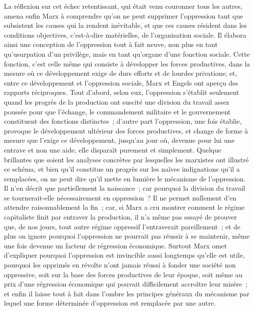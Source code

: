 \documentclass[french,twoside]{book} %
\begin{document}
La réflexion sur cet échec retentissant, qui était venu couronner tous les autres, amena enfin Marx à comprendre qu'on ne peut supprimer l'oppression tant que subsistent les causes qui la rendent inévitable, et que ces causes résident dans les conditions objectives, c'est-à-dire matérielles, de l'organisation sociale. Il élabora ainsi une conception de l'oppression tout à fait neuve, non plus en tant qu'usurpation d'un privilège, mais en tant qu'organe d'une fonction sociale. Cette fonction, c'est celle même qui consiste à développer les forces productives, dans la mesure où ce développement exige de durs efforts et de lourdes privations; et, entre ce développement et l'oppression sociale, Marx et Engels ont aperçu des rapports réciproques. Tout d'abord, selon eux, l'oppression s'établit seulement quand les progrès de la production ont suscité une division du travail assez poussée pour que l'échange, le commandement militaire et le gouvernement constituent des fonctions distinctes ; d'autre part l'oppression, une fois établie, provoque le développement ultérieur des forces productives, et change de forme à mesure que l'exige ce développement, jusqu'au jour où, devenue pour lui une entrave et non une aide, elle disparaît purement et simplement. Quelque brillantes que soient les analyses concrètes par lesquelles les marxistes ont illustré ce schéma, et bien qu'il constitue un progrès sur les naïves indignations qu'il a remplacées, on ne peut dire qu'il mette en lumière le mécanisme de l'oppression. Il n'en décrit que partiellement la naissance ; car pourquoi la division du travail se tournerait-elle nécessairement en oppression ? Il ne permet nullement d'en attendre raisonnablement la fin ; car, si Marx a cru montrer comment le régime capitaliste finit par entraver la production, il n'a même pas essayé de prouver que, de nos jours, tout autre régime oppressif l'entraverait pareillement ; et de plus on ignore pourquoi l'oppression ne pourrait pas réussir à se maintenir, même une fois devenue un facteur de régression économique. Surtout Marx omet d'expliquer pourquoi l'oppression est invincible aussi longtemps qu'elle est utile, pourquoi les opprimés en révolte n'ont jamais réussi à fonder une société non oppressive, soit sur la base des forces productives de leur époque, soit même au prix d'une régression économique qui pouvait difficilement accroître leur misère ; et enfin il laisse tout à fait dans l'ombre les principes généraux du mécanisme par lequel une forme déterminée d'oppression est remplacée par une autre.\par
\end{document}
